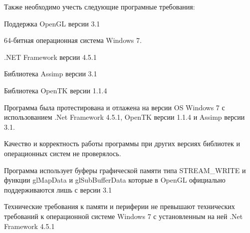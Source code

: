 \bigskip

Также необходимо учесть следующие програмные требования:
\begin{my_enumerate}
\item Поддержка OpenGL версии 3.1
\item 64-битная операционная система Windows 7.
\item .NET Framework версии 4.5.1
\item Библиотека Assimp версии 3.1
\item Библиотека OpenTK версии 1.1.4
\end{my_enumerate}

Программа была протестирована и отлажена на версии OS Windows 7 с использованием .Net Framework 4.5.1, OpenTK версии 1.1.4 и Assimp версии 3.1.

Качество и корректность работы программы при других версиях библиотек и операционных систем не проверялось.

Программа использует буферы графической памяти типа STREAM\_WRITE и функции glMapData и glSubBufferData которые в OpenGL официально поддерживаются лишь с версии 3.1

Технические требования к памяти и периферии не превышают технических требований к операционной системе Windows 7 с установленным на ней .Net Framework 4.5.1

